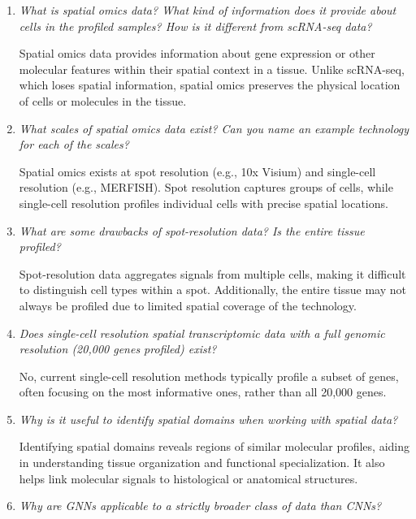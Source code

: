 \documentclass[a4paper]{article}
\begin{document}
\begin{enumerate}

    \item \textit{What is spatial omics data? What kind of information does it provide about cells in the profiled samples? How is it different from scRNA-seq data?}  
    
    Spatial omics data provides information about gene expression or other molecular features within their spatial context in a tissue.  
    Unlike scRNA-seq, which loses spatial information, spatial omics preserves the physical location of cells or molecules in the tissue.  

    \item \textit{What scales of spatial omics data exist? Can you name an example technology for each of the scales?}  
    
    Spatial omics exists at spot resolution (e.g., 10x Visium) and single-cell resolution (e.g., MERFISH).  
    Spot resolution captures groups of cells, while single-cell resolution profiles individual cells with precise spatial locations.  

    \item \textit{What are some drawbacks of spot-resolution data? Is the entire tissue profiled?}  
    
    Spot-resolution data aggregates signals from multiple cells, making it difficult to distinguish cell types within a spot.  
    Additionally, the entire tissue may not always be profiled due to limited spatial coverage of the technology.  

    \item \textit{Does single-cell resolution spatial transcriptomic data with a full genomic resolution (20,000 genes profiled) exist?}  
    
    No, current single-cell resolution methods typically profile a subset of genes, often focusing on the most informative ones, rather than all 20,000 genes.  

    \item \textit{Why is it useful to identify spatial domains when working with spatial data?}  
    
    Identifying spatial domains reveals regions of similar molecular profiles, aiding in understanding tissue organization and functional specialization.  
    It also helps link molecular signals to histological or anatomical structures.  

    \item \textit{Why are GNNs applicable to a strictly broader class of data than CNNs?}  
    

\end{enumerate}
\end{document}
